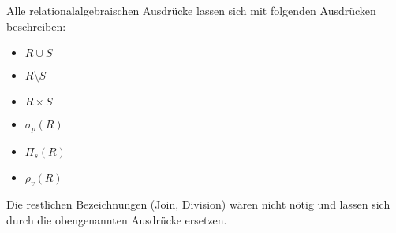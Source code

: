 Alle relationalalgebraischen Ausdrücke lassen sich mit folgenden Ausdrücken beschreiben:

\begin{itemize}
	\item $R \cup S$
	\item $R \setminus S$
	\item $R \times S$
	\item $\sigma_p(R)$
	\item $\Pi_s(R)$
	\item $\rho_v(R)$
\end{itemize}

Die restlichen Bezeichnungen (Join, Division) wären nicht nötig und lassen sich durch die obengenannten Ausdrücke ersetzen.